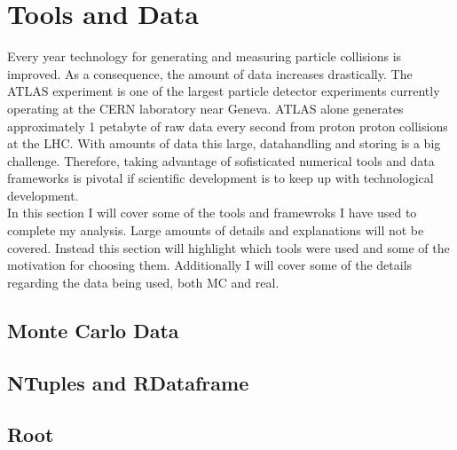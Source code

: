 \section{Tools and Data}
Every year technology for generating and measuring particle collisions is improved. 
As a consequence, the amount of data increases drastically. The ATLAS experiment
is one of the largest particle detector experiments currently operating at the 
CERN laboratory near Geneva. ATLAS alone generates approximately 1 petabyte of raw
data every second from proton proton collisions at the \ac{LHC}. 
With amounts of data this large, datahandling and storing is a big challenge. 
Therefore, taking advantage of sofisticated numerical tools and data frameworks is
pivotal if scientific development is to keep up with technological development.
\\
In this section I will cover some of the tools and framewroks I have used to 
complete my analysis. Large amounts of details and explanations will not be covered. 
Instead this section will highlight which tools were used and some of the motivation
for choosing them. Additionally I will cover some of the details regarding the data
being used, both \ac{MC} and real.
\subsection{Monte Carlo Data}
\subsection{NTuples and RDataframe}
\subsection{Root}